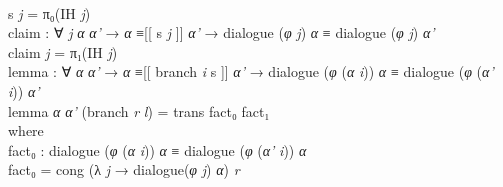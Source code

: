 \documentclass{entcs} \usepackage{prentcsmacro}
\newcommand{\AgdaFontStyle}[1]{\textsf{#1}}
\newcommand{\AgdaBoundFontStyle}[1]{\textit{#1}}
\newcommand{\AgdaKeyword}     [1]
    {\AgdaFontStyle{\textcolor{AgdaKeyword}{#1}}}
\newcommand{\AgdaSymbol}      [1]{\textcolor{AgdaSymbol}{#1}}
\newcommand{\AgdaBound}    [1]{\AgdaBoundFontStyle{\textcolor{AgdaBound}{#1}}}
\newcommand{\AgdaInductiveConstructor}[1]
    {\AgdaFontStyle{\textcolor{AgdaInductiveConstructor}{#1}}}
\newcommand{\AgdaDatatype} [1]{\AgdaFontStyle{\textcolor{AgdaDatatype}{#1}}}
\newcommand{\AgdaFunction} [1]{\AgdaFontStyle{\textcolor{AgdaFunction}{#1}}}
\newcommand{\AgdaIndent}[1]{\quad}
\newcommand{\AgdaCodeStyle}{\small}
\newenvironment{code}%
{\noindent\AgdaCodeStyle\pboxed}%
{\endpboxed\par\noindent%
\ignorespacesafterend}
\begin{document}
\begin{code}
\\
\>[0]\AgdaIndent{4}{}\<[4]%
\>[4]\AgdaFunction{s} \AgdaBound{j} \AgdaSymbol{=} \AgdaFunction{π₀}\AgdaSymbol{(}\AgdaFunction{IH} \AgdaBound{j}\AgdaSymbol{)}\<%
\\
\>[0]\AgdaIndent{4}{}\<[4]%
\>[4]\AgdaFunction{claim} \AgdaSymbol{:} \AgdaSymbol{∀} \AgdaBound{j} \AgdaBound{α} \AgdaBound{α'} \AgdaSymbol{→} \AgdaBound{α} \AgdaDatatype{≡[[} \AgdaFunction{s} \AgdaBound{j} \AgdaDatatype{]]} \AgdaBound{α'} \AgdaSymbol{→} \AgdaFunction{dialogue} \AgdaSymbol{(}\AgdaBound{φ} \AgdaBound{j}\AgdaSymbol{)} \AgdaBound{α} \AgdaDatatype{≡} \AgdaFunction{dialogue} \AgdaSymbol{(}\AgdaBound{φ} \AgdaBound{j}\AgdaSymbol{)} \AgdaBound{α'}\<%
\\
\>[0]\AgdaIndent{4}{}\<[4]%
\>[4]\AgdaFunction{claim} \AgdaBound{j} \AgdaSymbol{=} \AgdaFunction{π₁}\AgdaSymbol{(}\AgdaFunction{IH} \AgdaBound{j}\AgdaSymbol{)}\<%
\\
\>[0]\AgdaIndent{4}{}\<[4]%
\>[4]\AgdaFunction{lemma} \AgdaSymbol{:} \AgdaSymbol{∀} \AgdaBound{α} \AgdaBound{α'} \AgdaSymbol{→} \AgdaBound{α} \AgdaDatatype{≡[[} \AgdaInductiveConstructor{branch} \AgdaBound{i} \AgdaFunction{s} \AgdaDatatype{]]} \AgdaBound{α'} \AgdaSymbol{→} \AgdaFunction{dialogue} \AgdaSymbol{(}\AgdaBound{φ} \AgdaSymbol{(}\AgdaBound{α} \AgdaBound{i}\AgdaSymbol{))} \AgdaBound{α} \AgdaDatatype{≡} \AgdaFunction{dialogue} \AgdaSymbol{(}\AgdaBound{φ} \AgdaSymbol{(}\AgdaBound{α'} \AgdaBound{i}\AgdaSymbol{))} \AgdaBound{α'} \<[92]%
\>[92]\<%
\\
\>[0]\AgdaIndent{4}{}\<[4]%
\>[4]\AgdaFunction{lemma} \AgdaBound{α} \AgdaBound{α'} \AgdaSymbol{(}\AgdaInductiveConstructor{branch} \AgdaBound{r} \AgdaBound{l}\AgdaSymbol{)} \AgdaSymbol{=} \AgdaFunction{trans} \AgdaFunction{fact₀} \AgdaFunction{fact₁} \<[48]%
\>[48]\<%
\\
\>[4]\AgdaIndent{6}{}\<[6]%
\>[6]\AgdaKeyword{where}\<%
\\
\>[6]\AgdaIndent{8}{}\<[8]%
\>[8]\AgdaFunction{fact₀} \AgdaSymbol{:} \AgdaFunction{dialogue} \AgdaSymbol{(}\AgdaBound{φ} \AgdaSymbol{(}\AgdaBound{α} \AgdaBound{i}\AgdaSymbol{))} \AgdaBound{α} \AgdaDatatype{≡} \AgdaFunction{dialogue} \AgdaSymbol{(}\AgdaBound{φ} \AgdaSymbol{(}\AgdaBound{α'} \AgdaBound{i}\AgdaSymbol{))} \AgdaBound{α} \<[61]%
\>[61]\<%
\\
\>[6]\AgdaIndent{8}{}\<[8]%
\>[8]\AgdaFunction{fact₀} \AgdaSymbol{=} \AgdaFunction{cong} \AgdaSymbol{(λ} \AgdaBound{j} \AgdaSymbol{→} \AgdaFunction{dialogue}\AgdaSymbol{(}\AgdaBound{φ} \AgdaBound{j}\AgdaSymbol{)} \AgdaBound{α}\AgdaSymbol{)} \AgdaBound{r}\<%

\end{code}
\end{document}
